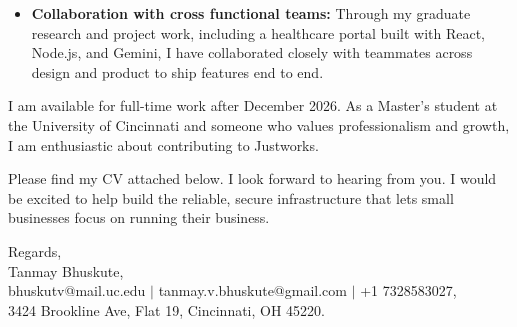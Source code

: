 \documentclass[11pt]{letter}
\begin{document}
\begin{letter}{}
\begin{itemize}[leftmargin=*, itemsep=0.45em]
    \item \textbf{Collaboration with cross functional teams:} Through my graduate research and project work, including a healthcare portal built with React, Node.js, and Gemini, I have collaborated closely with teammates across design and product to ship features end to end.
\end{itemize}

I am available for full-time work after December 2026. As a Master's student at the University of Cincinnati and someone who values professionalism and growth, I am enthusiastic about contributing to Justworks.

Please find my CV attached below. I look forward to hearing from you. I would be excited to help build the reliable, secure infrastructure that lets small businesses focus on running their business.

{\setlength{\parskip}{0pt}
Regards,\\
Tanmay Bhuskute,\\
bhuskutv@mail.uc.edu $\mid$ tanmay.v.bhuskute@gmail.com $\mid$ +1 7328583027,\\
3424 Brookline Ave, Flat 19, Cincinnati, OH 45220.
}

\end{letter}
\end{document}
